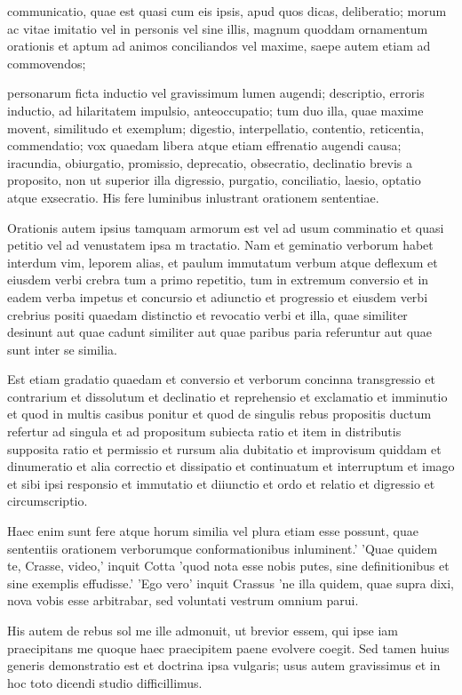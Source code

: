  communicatio, quae est quasi cum eis ipsis, apud quos dicas, deliberatio; morum ac vitae imitatio vel in personis vel sine illis, magnum quoddam ornamentum orationis et aptum ad animos conciliandos vel maxime, saepe autem etiam ad commovendos;

 personarum ficta inductio vel gravissimum lumen augendi; descriptio, erroris inductio, ad hilaritatem impulsio, anteoccupatio; tum duo illa, quae maxime movent, similitudo et exemplum; digestio, interpellatio, contentio, reticentia, commendatio; vox quaedam libera atque etiam effrenatio augendi causa; iracundia, obiurgatio, promissio, deprecatio, obsecratio, declinatio brevis a proposito, non ut superior illa digressio, purgatio, conciliatio, laesio, optatio atque exsecratio. His fere luminibus inlustrant orationem sententiae.

 Orationis autem ipsius tamquam armorum est vel ad usum comminatio et quasi petitio vel ad venustatem ipsa m tractatio. Nam et geminatio verborum habet interdum vim, leporem alias, et paulum immutatum verbum atque deflexum et eiusdem verbi crebra tum a primo repetitio, tum in extremum conversio et in eadem verba impetus et concursio et adiunctio et progressio et eiusdem verbi crebrius positi quaedam distinctio et revocatio verbi et illa, quae similiter desinunt aut quae cadunt similiter aut quae paribus paria referuntur aut quae sunt inter se similia.

 Est etiam gradatio quaedam et conversio et verborum concinna transgressio et contrarium et dissolutum et declinatio et reprehensio et exclamatio et imminutio et quod in multis casibus ponitur et quod de singulis rebus propositis ductum refertur ad singula et ad propositum subiecta ratio et item in distributis supposita ratio et permissio et rursum alia dubitatio et improvisum quiddam et dinumeratio et alia correctio et dissipatio et continuatum et interruptum et imago et sibi ipsi responsio et immutatio et diiunctio et ordo et relatio et digressio et circumscriptio.

 Haec enim sunt fere atque horum similia vel plura etiam esse possunt, quae sententiis orationem verborumque conformationibus inluminent.' 'Quae quidem te, Crasse, video,' inquit Cotta 'quod nota esse nobis putes, sine definitionibus et sine exemplis effudisse.' 'Ego vero' inquit Crassus 'ne illa quidem, quae supra dixi, nova vobis esse arbitrabar, sed voluntati vestrum omnium parui.

 His autem de rebus sol me ille admonuit, ut brevior essem, qui ipse iam praecipitans me quoque haec praecipitem paene evolvere coegit. Sed tamen huius generis demonstratio est et doctrina ipsa vulgaris; usus autem gravissimus et in hoc toto dicendi studio difficillimus.

